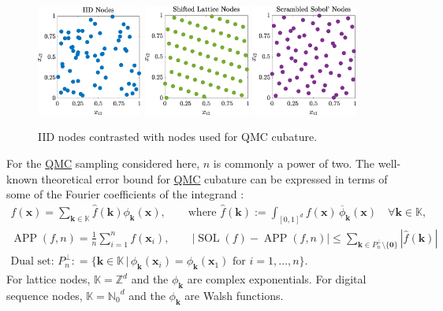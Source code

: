 \documentclass[11pt]{NSFamsart}
\newcommand{\QMC}{\hyperlink{QMClink}{QMC}\xspace}
\newcommand{\hf}{\widehat{f}}
\newcommand{\natzero}{{\mathbb{N}_0}}
\newcommand{\integers}{{\mathbb{Z}}}
\newcommand{\bbK}{\mathbb{K}}
\DeclareMathOperator{\SOL}{SOL}
\DeclareMathOperator{\APP}{APP}
\newcommand{\bzero}{\boldsymbol{0}}
\newcommand{\bx}{{\boldsymbol{x}}}
\newcommand{\bk}{{\boldsymbol{k}}}
\def\abs#1{\ensuremath{\left \lvert #1 \right \rvert}}
\begin{document}
\begin{figure}[h] %
	\centering
	\includegraphics[width = 0.31\textwidth]{ProgramsImages/IIDPoints.eps} \quad
	\includegraphics[width = 0.31\textwidth]{ProgramsImages/ShiftedLatticePoints.eps}  \quad
	\includegraphics[width = 0.31\textwidth]{ProgramsImages/SSobolPoints.eps} 
	
	\caption{IID nodes contrasted with nodes used for QMC cubature.\label{PtsFig}}
\end{figure}

For the \QMC sampling considered here, $n$ is 
commonly a power of two.  The well-known theoretical error bound for 
\QMC cubature can be expressed in terms of some of the Fourier coefficients of the 
integrand \cite{DicEtal14a, DicPil10a, HicJim16a,JimHic16a, Nie92, SloJoe94}:
\begin{gather}
\nonumber
f(\bx) = \sum_{\bk \in \bbK} \hf(\bk) \phi_{\bk} (\bx),  \qquad \text{where } \hf(\bk) := \int_{[0,1]^d} 
f(\bx) \, \overline{\phi}_{\bk}(\bx) \quad \forall \bk \in \bbK, \\
\label{multiInt} \APP(f,n) = \frac 1n \sum_{i=1}^{n} f(\bx_i), \qquad
\abs{\SOL(f) - \APP(f,n)} \le \sum_{\bk \in P^\perp_n \setminus\{\bzero\}} \abs{\hf(\bk)} \\
\nonumber
\text{Dual set: }P_n^\perp : = \{\bk \in \bbK \, \vert \, \phi_{\bk}(\bx_i) = \phi_{\bk}(\bx_1) \text{ for } 
i=1, \ldots, n \}.
\end{gather}
For lattice nodes, $\bbK = \integers^d$ and the $\phi_{\bk}$ are complex exponentials.  For digital sequence nodes,  $\bbK = \natzero^d$ and the $\phi_{\bk}$ are Walsh functions.
\end{document}
